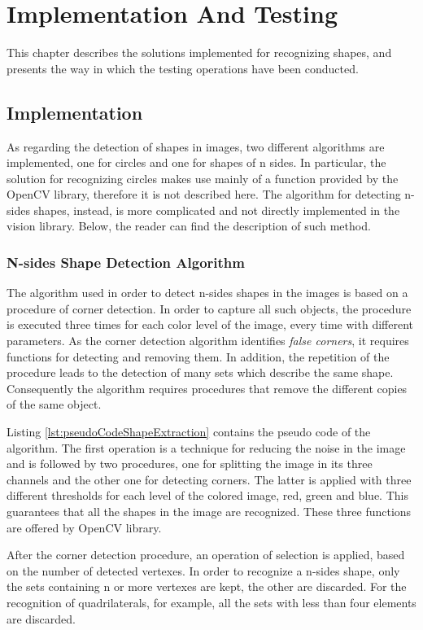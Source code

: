 \chapter{Implementation And Testing}\label{impl_test}
	This chapter describes the solutions implemented for recognizing shapes, and presents the way in which the testing operations have been conducted.
	
	
	\section{Implementation}
		As regarding the detection of shapes in images, two different algorithms are implemented, one for circles and one for shapes of n sides.
		In particular, the solution for recognizing circles makes use mainly of a function provided by the \mbox{OpenCV} library, therefore it is not described here.
		The algorithm for detecting n-sides shapes, instead, is more complicated and not directly implemented in the vision library. 
		Below, the reader can find the description of such method.
	
		\subsection{N-sides Shape Detection Algorithm}
		The algorithm used in order to detect n-sides shapes in the images is based on a procedure of corner detection. 
		In order to capture all such objects, the procedure is executed three times for each color level of the image, every time with different parameters.
		As the corner detection algorithm identifies \emph{false corners}, it requires functions for detecting and removing them. 
		In addition, the repetition of the procedure leads to the detection of many sets which describe the same shape.	
		Consequently the algorithm requires procedures that remove the different copies of the same object.


		
		Listing \ref{lst:pseudoCodeShapeExtraction} contains the pseudo code of the algorithm.
		The first operation is a technique for reducing the noise in the image and is followed by two procedures, one for splitting the image in its three channels and the other one for detecting corners.
		The latter is applied with three different thresholds for each level of the colored image, red, green and blue.
		This guarantees that all the shapes in the image are recognized.
		These three functions are offered by \mbox{OpenCV} library.

		
		After the corner detection procedure, an operation of selection is applied, based on the number of detected vertexes.
		In order to recognize a n-sides shape, only the sets containing n or more vertexes are kept, the other are discarded.
		For the recognition of quadrilaterals, for example, all the sets with less than four elements are discarded.
		
